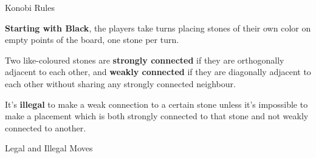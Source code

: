 \documentclass{beamer}
\begin{document}
  \begin{frame}{Konobi Rules}

    \textbf{Starting with Black}, the players take turns placing stones of their own color on empty points of the board, one stone per turn.

    \vspace{1em}

    Two like-coloured stones are \textbf{strongly connected} if they are orthogonally adjacent to each other, and \textbf{weakly connected} if they are diagonally adjacent to each other without sharing any strongly connected neighbour.

    \vspace{1em}

    It's \textbf{illegal} to make a weak connection to a certain stone unless it's impossible to make a placement which is both strongly connected to that stone and not weakly connected to another.

  \end{frame}



  \begin{frame}{Legal and Illegal Moves}


    \begin{figure}
      \centering
    \end{figure}

  \end{frame}
\end{document}
